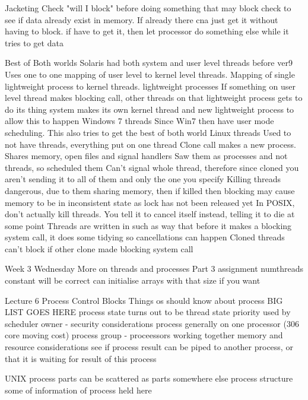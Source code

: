 \documentclass{article}
\begin{document}
	Jacketing
		Check "will I block" before doing something that may block
			check to see if data already exist in memory. If already there cna just get it without having to block. if have to get it, then let processor do something else while it tries to get data

	Best of Both worlds
		Solaris had both system and user level threads before ver9
			Uses one to one mapping of user level to kernel level threads.
			Mapping of single lightweight process to kernel threads. 
				lightweight processes
			If something on user level thread makes blocking call, other threads on that lightweight process gets to do its thing
				system makes its own kernel thread and new lightweight process to allow this to happen
		Windows 7 threads
			Since Win7 then have user mode scheduling. This also tries to get the best of both world
		Linux threads
			Used to not have threads, everything put on one thread
			Clone call
				makes a new process. Shares memory, open files and signal handlers
			Saw them as processes and not threads, so scheduled them
			Can't signal whole thread, therefore since cloned you aren't sending it to all of them and only the one you specify
			Killing threads dangerous, due to them sharing memory, then if killed then blocking may cause memory to be in inconsistent state as lock has not been released yet
			In POSIX, don't actually kill threads. You tell it to cancel itself instead, telling it to die at some point
				Threads are written in such as way that before it makes a blocking system call, it does some tidying so cancellations can happen
			Cloned threads can't block if other clone made blocking system call






Week 3 Wednesday
	More on threads and processes
	Part 3 assignment
		numthreads constant will be correct
			can initialise arrays with that size if you want

Lecture 6
	Process Control Blocks
		Things os should know about process
			BIG LIST GOES HERE
				process state turns out to be thread state
				priority used by scheduler
				owner - security considerations
				process generally on one processor (306 core moving cost)
				process group - proceessors working together
				memory and resource considerations
				see if process result can be piped to another process, or that it is waiting for result of this process

	UNIX process parts
		can be scattered as parts somewhere else
		process structure
			some of information of process held here
\end{document}
